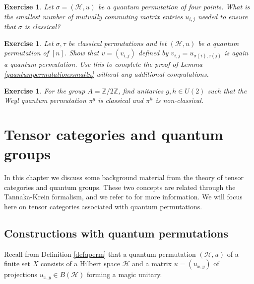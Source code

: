 \documentclass[a4paper]{amsart}
\newcommand*{\Hc}{\mathcal{H}}
\numberwithin{equation}{section}
\theoremstyle{change}
\newtheorem{exercise}[theorem]{Exercise}
\begin{document}
\begin{exercise}
Let $ \sigma = (\Hc,u) $ be a quantum permutation of four points. What is the smallest number of mutually commuting matrix entries $ u_{i,j} $ needed to ensure that $ \sigma $ is classical?
\end{exercise}

\begin{exercise} \label{exI3}
Let $ \sigma, \tau $ be classical permutations and let $ (\Hc,u) $ be a quantum permutation of $ [n] $. Show that $ v = (v_{i,j}) $ defined by $ v_{i,j} = u_{\sigma(i), \tau(j)} $ is again a quantum permutation. Use this to complete the proof of Lemma \ref{quantumpermutationssmalln} without any additional computations. 
\end{exercise}

\begin{exercise}
For the group $ A = \mathbb{Z}/2\mathbb{Z} $, find unitaries $ g,h \in U(2) $ such that the Weyl quantum permutation $ \pi^g $ is classical and $ \pi^h $ is non-classical.  
\end{exercise}


\section{Tensor categories and quantum groups} \label{ch2}

In this chapter we discuss some background material from the theory of tensor categories and quantum groups. These two concepts are related through the Tannaka-Krein formalism, and we refer to \cite{NESHVEYEV_TUSET_compactquantumgroups} for more information.
We will focus here on tensor categories associated with quantum permutations. 

\subsection{Constructions with quantum permutations} 

Recall from Definition \ref{defqperm} that a quantum permutation $ (\Hc,u) $ of a finite set $ X $ consists of a Hilbert space $ \Hc $ and a matrix $ u = (u_{x,y}) $ of projections $ u_{x,y} \in B(\Hc) $ forming a magic unitary. 
\end{document}
